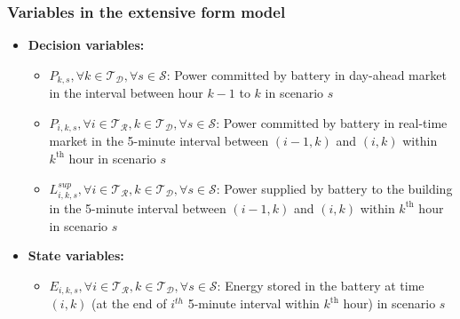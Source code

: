 \documentclass[11pt,twoside]{article}
\begin{document}
\subsubsection{Variables in the extensive form model}\label{subsubsec:var_ext}
\begin{itemize}
\item \textbf{Decision variables:}
\begin{itemize}
\item[\textbullet] $P_{k,s}, \forall k \in \mathcal{T_D}, \forall s \in \mathcal{S}$: Power committed by battery in day-ahead market in the interval between hour $k-1$ to $k$ in scenario $s$
\item[\textbullet] $P_{i,k,s}, \forall i \in \mathcal{T_R}, k \in \mathcal{T_D}, \forall s \in \mathcal{S}$: Power committed by battery in real-time market in the 5-minute interval between $(i-1,k)$ and $(i,k)$ within $k^\text{th}$ hour in scenario $s$
\item[\textbullet] $L^{sup}_{i,k,s}, \forall i \in \mathcal{T_R}, k \in \mathcal{T_D}, \forall s \in \mathcal{S}$: Power supplied by battery to the building in the 5-minute interval between $(i-1,k)$ and $(i,k)$ within $k^\text{th}$ hour in scenario $s$
\end{itemize}
\item \textbf{State variables:}
\begin{itemize}
\item[\textbullet] $E_{i,k,s}, \forall i \in \mathcal{T_R}, k \in \mathcal{T_D}, \forall s \in \mathcal{S}$: Energy stored in the battery at time $(i,k)$ (at the end of $i^{th}$ 5-minute interval within $k^\text{th}$ hour)  in scenario $s$
\end{itemize}
\end{itemize}
\end{document}

